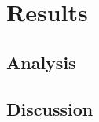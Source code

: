 
\chapter{Results}  \label{sec:results}

\section{Analysis}  \label{sec:analysis}

\section{Discussion}  \label{sec:discussion}

